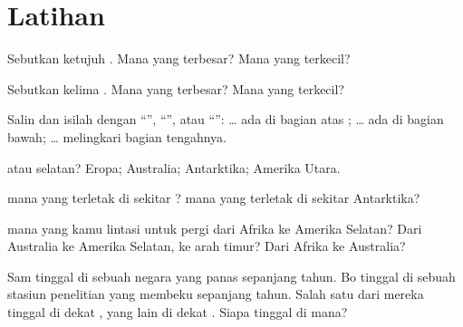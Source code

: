 \section{Latihan}

\begin{exercise}[$\star$]\label{exo:g3:continents-and-oceans:1}
Sebutkan ketujuh . Mana yang terbesar? Mana yang terkecil?
\end{exercise}

\begin{exercise}[$\star$]\label{exo:g3:continents-and-oceans:2}
Sebutkan kelima . Mana yang terbesar? Mana yang terkecil?
\end{exercise}

\begin{exercise}[$\star$]\label{exo:g3:continents-and-oceans:3}
Salin dan isilah dengan ``'', ``'', atau
``'': \dots{} ada di bagian atas ; \dots{} ada di
bagian bawah; \dots{} melingkari bagian tengahnya.
\end{exercise}

\begin{exercise}[$\star$]\label{exo:g3:continents-and-oceans:4}
 atau selatan? Eropa; Australia; Antarktika; Amerika
Utara.
\end{exercise}

\begin{exercise}[$\star$]\label{exo:g3:continents-and-oceans:5}
 mana yang terletak di sekitar ?  mana yang
terletak di sekitar Antarktika?
\end{exercise}

\begin{exercise}[$\star\star$]\label{exo:g3:continents-and-oceans:6}
 mana yang kamu lintasi untuk pergi dari Afrika ke Amerika Selatan?
Dari Australia ke Amerika Selatan, ke arah timur? Dari Afrika ke Australia?
\end{exercise}

\begin{exercise}[$\star\star$]\label{exo:g3:continents-and-oceans:7}
Sam tinggal di sebuah negara yang panas sepanjang tahun. Bo tinggal di
sebuah stasiun penelitian yang membeku sepanjang tahun. Salah satu dari
mereka tinggal di dekat , yang lain di dekat . Siapa
tinggal di mana?
\end{exercise}

